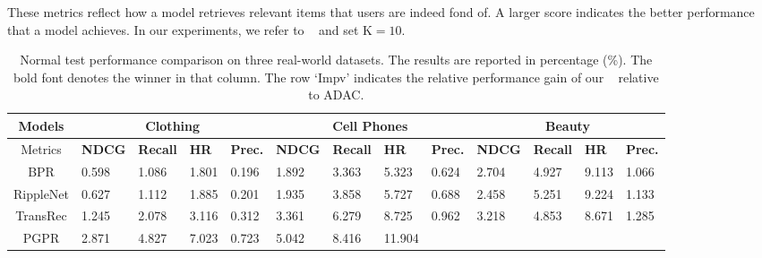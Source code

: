 %
These metrics reflect how a model retrieves relevant items that users are indeed fond of. A larger score indicates the better performance that a model achieves. In our experiments, we refer to ~\cite{pgpr} and set $\text{K}=10$.



\begin{table}[t!]
\centering
\small
\caption{Normal test performance comparison on three real-world datasets. The results are reported in percentage (\%). The bold font denotes the winner in that column. The row `Impv' indicates the relative performance gain of our \tkgrec~ relative to ADAC.}\label{overallComp}
{
\begin{tabular}{c|p{0.65cm}<{\raggedleft}p{0.65cm}<{\raggedleft}p{0.65cm}<{\raggedleft}p{0.65cm}<{\raggedleft}|
p{0.65cm}<{\raggedleft}p{0.65cm}<{\raggedleft}p{0.65cm}<{\raggedleft}p{0.65cm}<{\raggedleft}|
p{0.65cm}<{\raggedleft}p{0.65cm}<{\raggedleft}p{0.65cm}<{\raggedleft}p{0.65cm}<{\raggedleft}}
\hline  \hline
Models      &
\multicolumn{4}{c|}{\textbf{Clothing}}                               &
\multicolumn{4}{c|}{\textbf{Cell Phones}}                                 &
\multicolumn{4}{c}{\textbf{Beauty}}
\\ \hline
Metrics     & \textbf{NDCG}  & \textbf{Recall} & \textbf{HR}     &
\textbf{Prec.} & \textbf{NDCG}  & \textbf{Recall} & \textbf{HR}    &
\textbf{Prec.} & \textbf{NDCG} & \textbf{Recall} & \textbf{HR}     &
\textbf{Prec.} \\ \hline
BPR         & 0.598          & 1.086           & 1.801          &
0.196              & 1.892          & 3.363           & 5.323           &
0.624              & 2.704         & 4.927           & 9.113           &
1.066              \\
RippleNet   & 0.627          & 1.112           & 1.885          &
0.201              & 1.935          & 3.858           & 5.727           &
0.688              & 2.458         & 5.251           & 9.224           &
1.133              \\
TransRec    & 1.245          & 2.078           & 3.116          &
0.312              & 3.361          & 6.279           & 8.725           &
0.962              & 3.218         & 4.853           & 8.671           &
1.285              \\
PGPR        & 2.871          & 4.827           & 7.023          &
0.723              & 5.042          & 8.416           & 11.904          &

\end{tabular}}
\end{table}
